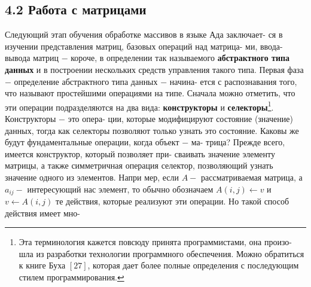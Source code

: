 \documentclass{./git_rep/mai_prac_2017/template/mai_book}
\begin{document}
\subsection{4.2 Работа с матрицами}
\noindent
Следующий этап обучения обработке массивов в языке Ада заключает-\linebreak
ся  в  изучении  представления  матриц,  базовых операций  над  матрица-\linebreak
ми,  ввода-вывода  матриц  $-$  короче,  в  определении  так  называемого\linebreak
\textbf{абстрактного  типа  данных} и  в  построении  нескольких  средств\linebreak
управления  такого типа.\newline
\hspace*{15pt}Первая  фаза $-$  определение  абстрактного  типа  данных $-$ начина-\linebreak
ется с распознавания того, что называют простейшими  операциями на\linebreak
типе.  Сначала можно отметить,  что эти  операции  подразделяются  на\linebreak
два вида: \textbf{конструкторы } и \textbf{селекторы}\footnote{
Эта терминология кажется повсюду принята программистами, она произо-\linebreak
шла из разработки технологии программного обеспечения. Можно обратиться к\linebreak
книге Буха $[27]$, которая дает более полные определения с последующим стилем\linebreak
программирования.}. Конструкторы $-$ это опера-\linebreak
ции,  которые  модифицируют состояние  (значение)  данных,  тогда как\linebreak
селекторы  позволяют только узнать это состояние.\newline
\hspace*{15pt}Каковы  же  будут фундаментальные операции,  когда объект $-$  ма-\linebreak
трица?  Прежде  всего,  имеется  конструктор,  который  позволяет  при-\linebreak
сваивать значение элементу матрицы,  а также симметричная операция\linebreak
селектор,  позволяющий  узнать  значение  одного  из  элементов.  Напри\linebreak
мер,  если $A - $ рассматриваемая  матрица,  а $a_{ij}-$ интересующий  нас\linebreak
элемент, то обычно обозначаем $A(i,j)\longleftarrow v$ и $v\longleftarrow A(i,j)$ те действия,\linebreak
которые реализуют эти операции. Но такой способ действия имеет мно-\linebreak
\newpage
\end{document}

